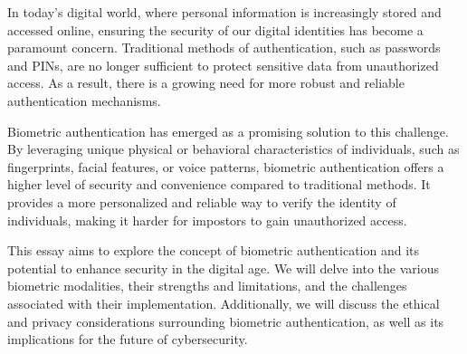 
\hspace{1.5 em}In today's digital world, where personal information is increasingly stored and accessed online, ensuring the security of our digital identities has become a paramount concern. Traditional methods of authentication, such as passwords and PINs, are no longer sufficient to protect sensitive data from unauthorized access. As a result, there is a growing need for more robust and reliable authentication mechanisms.

Biometric authentication has emerged as a promising solution to this challenge. By leveraging unique physical or behavioral characteristics of individuals, such as fingerprints, facial features, or voice patterns, biometric authentication offers a higher level of security and convenience compared to traditional methods. It provides a more personalized and reliable way to verify the identity of individuals, making it harder for impostors to gain unauthorized access.

This essay aims to explore the concept of biometric authentication and its potential to enhance security in the digital age. We will delve into the various biometric modalities, their strengths and limitations, and the challenges associated with their implementation. Additionally, we will discuss the ethical and privacy considerations surrounding biometric authentication, as well as its implications for the future of cybersecurity.

